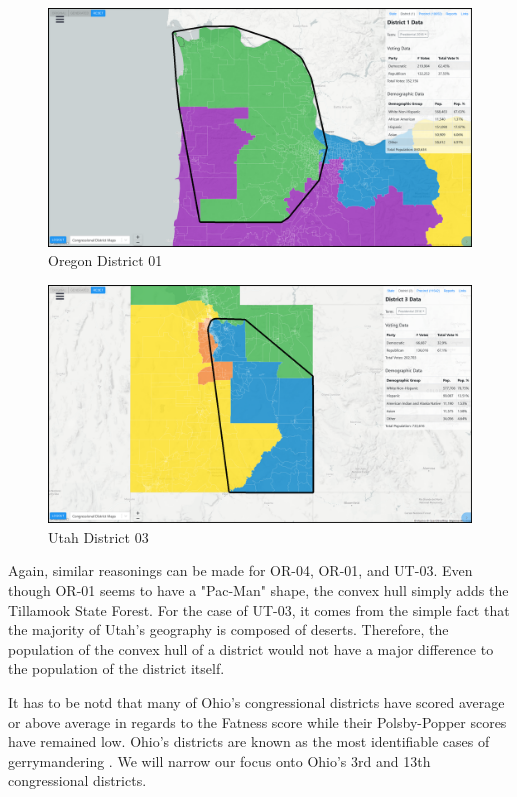 \documentclass[letterpaper]{article}
\begin{document}
\begin{figure}[H]
	\includegraphics[width=\linewidth]{./figures/OR-01-ConvexHull.png}
	\caption{Oregon District 01}
	\label{fig:or01ch}
\end{figure}

\begin{figure}[H]
	\includegraphics[width=\linewidth]{./figures/UT-03-ConvexHull.png}
	\caption{Utah District 03}
	\label{fig:ut03ch}
\end{figure}

Again, similar reasonings can be made for OR-04, OR-01, and UT-03. Even though OR-01 seems to have a "Pac-Man" shape, the convex hull simply adds the Tillamook State Forest. For the case of UT-03, it comes from the simple fact that the majority of Utah's geography is composed of deserts. Therefore, the population of the convex hull of a district would not have a major difference to the population of the district itself.

It has to be notd that many of Ohio's congressional districts have scored average or above average in regards to the Fatness score while their Polsby-Popper scores have remained low. Ohio's districts are known as the most identifiable cases of gerrymandering \cite{ohiog}. We will narrow our focus onto Ohio's 3rd and 13th congressional districts.
\end{document}
